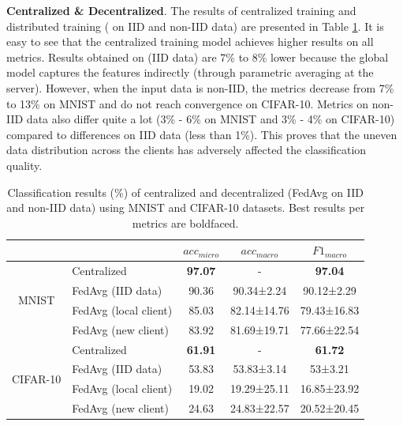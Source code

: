 \documentclass[runningheads]{llncs}
\begin{document}
\textbf{Centralized \& Decentralized}. The results of centralized training and distributed training ( on IID and non-IID data) are presented in Table \ref{fig:central_decentral}. It is easy to see that the centralized training model achieves higher results on all metrics. Results obtained on  (IID data) are 7\% to 8\% lower because the global model captures the features indirectly (through parametric averaging at the server). However, when the input data is non-IID, the metrics decrease from 7\% to 13\% on MNIST and do not reach convergence on CIFAR-10. Metrics on non-IID data also differ quite a lot (3\% - 6\% on MNIST and 3\% - 4\% on CIFAR-10) compared to differences on IID data (less than 1\%). This proves that the uneven data distribution across the clients has adversely affected the classification quality.

\begin{table}[h]
    \centering
    \caption{Classification results (\%) of centralized and decentralized (FedAvg on IID and non-IID data) using MNIST and CIFAR-10 datasets. Best results per metrics are boldfaced.}
    \label{fig:central_decentral}
    \begin{tabular}{c|l|ccc} 
    \toprule
    \multicolumn{1}{c}{}      &                       & $acc_{micro}$  & $acc_{macro}$ & $F1_{macro}$    \\ 
    \hline
    \multirow{4}{*}{MNIST}    & Centralized           & \textbf{97.07} & -             & \textbf{97.04}  \\
                              & FedAvg (IID data)     & 90.36          & 90.34±2.24    & 90.12±2.29      \\
                              & FedAvg (local client) & 85.03          & 82.14±14.76   & 79.43±16.83     \\
                              & FedAvg (new client)   & 83.92          & 81.69±19.71   & 77.66±22.54     \\ 
    \hline
    \multirow{4}{*}{CIFAR-10} & Centralized           & \textbf{61.91} & -             & \textbf{61.72}  \\
                              & FedAvg (IID data)     & 53.83          & 53.83±3.14    & 53±3.21         \\
                              & FedAvg (local client) & 19.02          & 19.29±25.11   & 16.85±23.92     \\
                              & FedAvg (new client)   & 24.63          & 24.83±22.57   & 20.52±20.45     \\
    \bottomrule
    \end{tabular}
\end{table}
\end{document}
